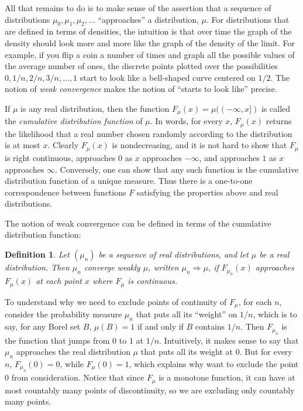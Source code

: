 \documentclass{article}
\newtheorem{definition}[theorem]{Definition}
\begin{document}
All that remains to do is to make sense of the assertion that a sequence of distributions $\mu_0, \mu_1, \mu_2, \ldots$ ``approaches'' a distribution, $\mu$. For distributions that are defined in terms of densities, the intuition is that over time the graph of the density should look more and more like the graph of the density of the limit. For example, if you flip a coin a number of times and graph all the possible values of the average number of ones, the discrete points plotted over the possibilities $0, 1/n, 2/n, 3/n, \ldots, 1$ start to look like a bell-shaped curve centered on $1 / 2$. The notion of \emph{weak convergence} makes the notion of ``starts to look like'' precise.

If $\mu$ is any real distribution, then the function $F_\mu(x) = \mu((-\infty, x])$ is called the \emph{cumulative distribution function} of $\mu$. In words, for every $x$, $F_\mu(x)$ returns the likelihood that a real number chosen randomly according to the distribution is at most $x$. Clearly $F_\mu(x)$ is nondecreasing, and it is not hard to show that $F_\mu$ is right continuous, approaches $0$ as $x$ approaches $-\infty$, and approaches $1$ as $x$ approaches $\infty$. Conversely, one can show that any such function is the cumulative distribution function of a unique measure. Thus there is a one-to-one correspondence between functions $F$ satisfying the properties above and real distributions.

The notion of weak convergence can be defined in terms of the cumulative distribution function:
\begin{definition}
 Let $(\mu_n)$ be a sequence of real distributions, and let $\mu$ be a real distribution. Then \emph{$\mu_n$ converge weakly $\mu$}, written $\mu_n \Rightarrow \mu$, if $F_{\mu_n}(x)$ approaches $F_\mu(x)$ at each point $x$ where $F_\mu$ is continuous.
\end{definition}

To understand why we need to exclude points of continuity of $F_\mu$, for each $n$, consider the probability measure $\mu_n$ that puts all its ``weight'' on $1 / n$, which is to say, for any Borel set $B$, $\mu(B) = 1$ if and only if $B$ contains $1 / n$. Then $F_{\mu_n}$ is the function that jumps from $0$ to $1$ at $1 / n$. Intuitively, it makes sense to say that $\mu_n$ approaches the real distribution $\mu$ that puts all its weight at $0$. But for every $n$, $F_{\mu_n}(0) = 0$, while $F_\mu(0) = 1$, which explains why want to exclude the point $0$ from consideration. Notice that since $F_\mu$ is a monotone function, it can have at most countably many points of discontinuity, so we are excluding only countably many points.
\end{document}
